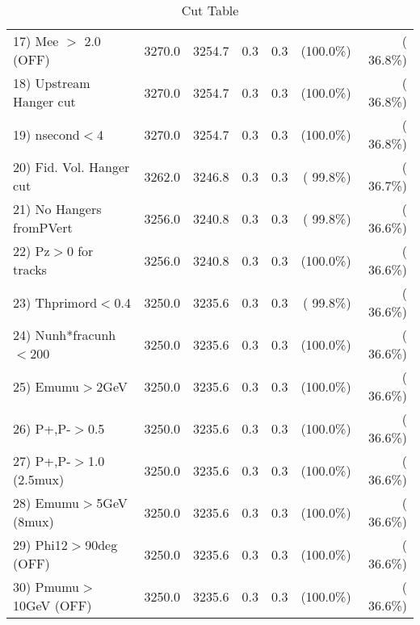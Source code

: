 \begin{table}[h!]
\begin{tabular}{||l||r|r|r|r|r|r||}
 17) Mee $>$ 2.0  (OFF)   &       3270.0 &       3254.7 &          0.3 &          0.3 & (100.0\%) & ( 36.8\%) \\
 18) Upstream Hanger cut  &       3270.0 &       3254.7 &          0.3 &          0.3 & (100.0\%) & ( 36.8\%) \\
 19) nsecond$<$4          &       3270.0 &       3254.7 &          0.3 &          0.3 & (100.0\%) & ( 36.8\%) \\
 20) Fid. Vol. Hanger cut &       3262.0 &       3246.8 &          0.3 &          0.3 & ( 99.8\%) & ( 36.7\%) \\
 21) No Hangers fromPVert &       3256.0 &       3240.8 &          0.3 &          0.3 & ( 99.8\%) & ( 36.6\%) \\
 22) Pz$>$0 for tracks    &       3256.0 &       3240.8 &          0.3 &          0.3 & (100.0\%) & ( 36.6\%) \\
 23) Thprimord$<$0.4      &       3250.0 &       3235.6 &          0.3 &          0.3 & ( 99.8\%) & ( 36.6\%) \\
 24) Nunh*fracunh$<$200   &       3250.0 &       3235.6 &          0.3 &          0.3 & (100.0\%) & ( 36.6\%) \\
 25) Emumu$>$2GeV         &       3250.0 &       3235.6 &          0.3 &          0.3 & (100.0\%) & ( 36.6\%) \\
 26) P+,P-$>$0.5          &       3250.0 &       3235.6 &          0.3 &          0.3 & (100.0\%) & ( 36.6\%) \\
 27) P+,P-$>$1.0 (2.5mux) &       3250.0 &       3235.6 &          0.3 &          0.3 & (100.0\%) & ( 36.6\%) \\
 28) Emumu$>$5GeV  (8mux) &       3250.0 &       3235.6 &          0.3 &          0.3 & (100.0\%) & ( 36.6\%) \\
 29) Phi12$>$90deg  (OFF) &       3250.0 &       3235.6 &          0.3 &          0.3 & (100.0\%) & ( 36.6\%) \\
 30) Pmumu$>$10GeV  (OFF) &       3250.0 &       3235.6 &          0.3 &          0.3 & (100.0\%) & ( 36.6\%) \\
 \hline
 \hline
 \end{tabular}
 \caption{Cut Table           }
 \label{tab-cutcohjpsi-mumu_jpsi}
 \end{table}
